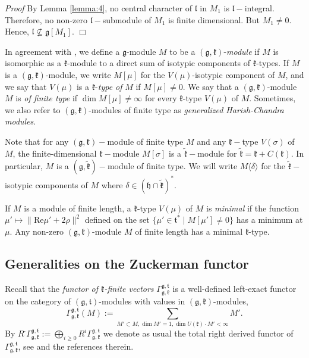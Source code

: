\documentclass[default]{./styles/svmult}
\renewenvironment{proof}{ \emph{Proof}}{$\Box$}
\renewcommand{\gg}{\mathfrak{g}}
\newcommand{\hh}{\mathfrak{h}}
\newcommand{\kk}{\mathfrak{k}}
\renewcommand{\ll}{\mathfrak{l}}
\renewcommand{\tt}{\mathfrak{t}}
\begin{document}
\begin{proof}
 By Lemma \ref{lemma:4}, no central character of $\ll$ in $M_1$ is $\ll-$integral. Therefore, no non-zero $\ll-$submodule of $M_1$ is finite dimensional. But $M_1 \neq 0$. Hence, $\ll \nsubseteq \gg[M_1]$.
\end{proof}

\vspace{0.5cm}

In agreement with \cite{PZ2}, we define a $\gg$-module $M$ to be a $(\gg,\kk)$-\textit{module} if $M$ is isomorphic as a $\kk$-module to a direct sum of isotypic components of $\kk$-types. If $M$ is a $(\gg,\kk)$-module, we write $M[\mu]$ for the $V(\mu)$-isotypic component of $M$, and we say that $V(\mu)$ is a $\kk$-\textit{type of} $M$ if $M[\mu]\neq 0$. We say that a $(\gg,\kk)$-module $M$ is \textit{of finite type} if $\dim M[\mu]\neq\infty$ for every $\kk$-type $V(\mu)$ of $M$. Sometimes, we also refer to $(\gg,\kk)$-modules of finite type as \textit{generalized Harish-Chandra modules}.

Note that for any $(\gg,\kk)-$module of finite type $M$ and any $\kk-$type $V(\sigma)$ of $M$, the finite-dimensional $\kk-$module $M[\sigma]$ is a $\tilde{\kk}-$module for $\tilde{\kk} = \kk + C(\kk)$. In particular, $M$ is a $(\gg,\tilde{\kk})-$module of finite type. We will write $M \langle\delta\rangle$ for the $\tilde{\kk}-$isotypic components of $M$ where $\delta \in (\hh \cap \tilde{\kk})^*$.

If $M$ is a module of finite length, a $\kk$-type $V(\mu)$ of $M$ is \textit{minimal} if the function $\mu '\mapsto \parallel\mathrm{Re}\mu '+2\rho \parallel^2 $ defined on the set $\{\mu '\in\tt^*\; |\; M[\mu ']\neq 0\}$ has a minimum at $\mu$. Any non-zero $(\gg,\kk)$-module $M$ of finite length has a minimal $\kk$-type.
 
\subsection{Generalities on the Zuckerman functor}\label{sect:1.4}

Recall that the \textit{functor of $\kk$-finite vectors} $\Gamma_{\gg,\kk}^{\gg,\tt}$ is a well-defined left-exact functor on the category of $(\gg,\tt)$-modules with values in $(\gg,\kk)$-modules, $$\Gamma_{\gg,\kk}^{\gg,\tt}(M):=\sum_{M'\subset M, \dim M'=1, \dim U(\kk)\cdot M'<\infty}M'.$$ By $R^\cdot\Gamma_{\gg,\kk}^{\gg,\tt}:=\bigoplus_{i\geq 0}R^i\Gamma_{\gg,\kk}^{\gg,\tt}$ we denote as usual the total right derived functor of $\Gamma_{\gg,\kk}^{\gg,\tt}$, see \cite{Z} and the references therein.
\end{document}

